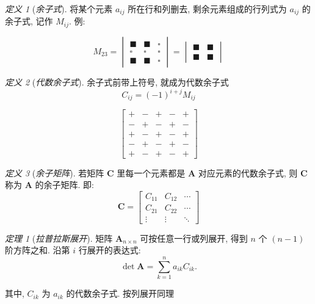 \documentclass[UTF8]{ctexart}
\theoremstyle{remark}
\newtheorem{Definition}{\hspace{1em} 定义}[subsection]
\newtheorem{Theorem}{\hspace{1em} 定理}[subsection]
\newenvironment{definition}[1]
{\begin{Definition}[#1] \hspace{0.5em}}
{\end{Definition} \vspace{0.5em}}
\newenvironment{theorem}[1]
{\begin{Theorem}[#1] \hspace{0.5em}}
{\end{Theorem} \vspace{0.5em}}
\newcommand{\mb}{\mathbf}
\begin{document}
\begin{framed}
    \begin{definition}{\textit{余子式}}
        将某个元素 $ a_{ij} $ 所在行和列删去, 剩余元素组成的行列式为 $ a_{ij} $ 的余子式, 记作 $ M_{ij} $. 例:

    \[ M_{23} = \begin{vmatrix}
        \blacksquare & \blacksquare & \square \\
        \square & \square & \square \\
        \blacksquare & \blacksquare & \square
        \end{vmatrix} = \begin{vmatrix}
        \blacksquare & \blacksquare \\
        \blacksquare & \blacksquare
    \end{vmatrix} \]
    \end{definition}

    \begin{definition}{\textit{代数余子式}}
    余子式前带上符号, 就成为代数余子式
        \[ C_{ij} = (-1)^{i + j} M_{ij} \]

        \[ \begin{bmatrix} 
            + & - & + & - & + \\
            - & + & - & + & - \\
            + & - & + & - & + \\
            - & + & - & + & - \\
            + & - & + & - & + 
        \end{bmatrix} \]
    \end{definition}

    \begin{definition}{\textit{余子矩阵}}
        若矩阵 $ \mb C $ 里每一个元素都是 $ \mb A $ 对应元素的代数余子式, 则 $ \mb C $ 称为 $ \mb A $ 的余子矩阵. 即:
        \[ \mb C = \begin{bmatrix}
            C_{11} & C_{12} & \cdots \\
            C_{21} & C_{22} & \cdots \\
            \vdots & \vdots & \ddots 
        \end{bmatrix} \]
    \end{definition}
\end{framed}

\begin{framed}
    \begin{theorem}{\textit{拉普拉斯展开}}
        矩阵 $ \mb A_{n \times n} $ 可按任意一行或列展开, 得到 $ n $ 个 $ (n-1) $ 阶方阵之和. 沿第 $ i $ 行展开的表达式:
        \[ \det \mb A = \sum_{k = 1}^{n} a_{ik} C_{ik} .\]

        其中, $ C_{ik} $ 为 $ a_{ik} $ 的代数余子式. 按列展开同理
        
    \end{theorem}    
\end{framed}
\end{document}
